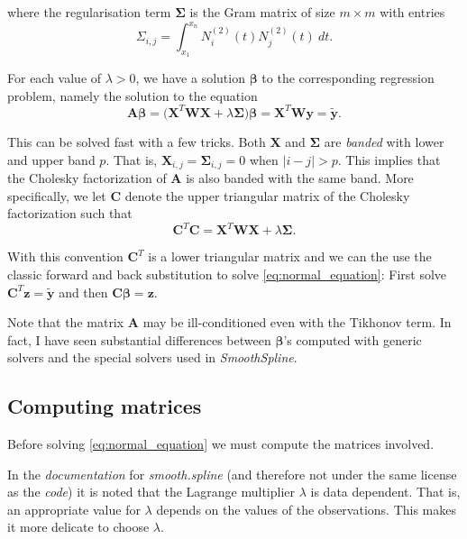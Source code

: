 \documentclass[a4paper]{scrartcl}
\newcommand{\vv}[1]{\ensuremath{\bm{#1}}}
\newcommand{\mat}[1]{\ensuremath{\bm{#1}}}
\newcommand{\T}[1]{\ensuremath{{#1}^{T}}}
\newcommand\dd{\ensuremath{\:d}}
\begin{document}
where the regularisation term $\mat\Sigma$ is the Gram matrix of size $m\times m$ with entries
\begin{equation*}
    \Sigma_{i,j} =
    \int_{x_1}^{x_n} N_i^{(2)}(t) N_j^{(2)}(t) \dd t.
\end{equation*}

For each value of $\lambda > 0$, we have a solution $\vv\beta$ to the corresponding regression problem, namely the solution to the equation
\begin{equation}
    \label{eq:normal_equation}
    \mat A \vv \beta
    = \bigl(\T{\mat X} \mat W \mat X + \lambda \mat\Sigma\bigr) \vv\beta
    = \T{\mat X} \mat W \vv y 
    = \widetilde{\vv y}.
\end{equation}

This can be solved fast with a few tricks.
Both $\mat X$ and $\mat\Sigma$ are \textit{banded} with lower and upper band $p$.
That is, $\mat X_{i,j} = \mat\Sigma_{i,j} = 0$ when $|i - j| > p$.
This implies that the Cholesky factorization of $\mat A$ is also banded with the same band.
More specifically, we let $\mat C$ denote the upper triangular matrix of the Cholesky factorization such that 
\begin{equation*}
    \T{\mat C} \mat C = \T{\mat X} \mat W \mat X + \lambda \mat\Sigma.
\end{equation*}

With this convention $\T{\mat C}$ is a lower triangular matrix and we can the use the classic forward and back substitution to solve \cref{eq:normal_equation}:
First solve $\T{\mat C} \vv z = \widetilde{\vv y}$ and then $\mat C \vv \beta = \vv z$.

Note that the matrix $\mat A$ may be ill-conditioned even with the Tikhonov term.
In fact, I have seen substantial differences between $\vv\beta$'s computed with generic solvers and the special solvers used in \textit{SmoothSpline}.


\subsection{Computing matrices}

Before solving \cref{eq:normal_equation} we must compute the matrices involved.

In the \textit{documentation} for \textit{smooth.spline} (and therefore not under the same license as the \textit{code}) it is noted that the Lagrange multiplier $\lambda$ is data dependent.
That is, an appropriate value for $\lambda$ depends on the values of the observations.
This makes it more delicate to choose $\lambda$.
\end{document}
